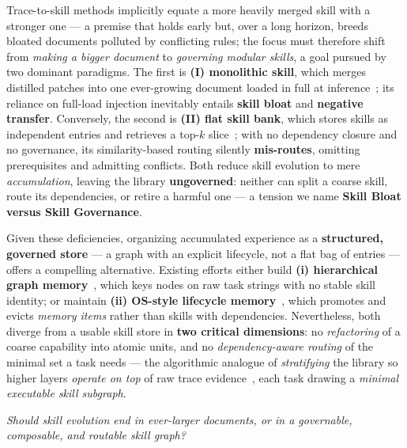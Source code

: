 Trace-to-skill methods implicitly equate a more heavily merged skill with a stronger one --- a premise that holds early but, over a long horizon, breeds bloated documents polluted by conflicting rules; the focus must therefore shift from \emph{making a bigger document} to \emph{governing modular skills}, a goal pursued by two dominant paradigms.
The first is \textbf{(I) monolithic skill}, which merges distilled patches into one ever-growing document loaded in full at inference~\citep{trace2skill,skillbrew,skillopt}; its reliance on full-load injection inevitably entails \textbf{skill bloat} and \textbf{negative transfer}.
Conversely, the second is \textbf{(II) flat skill bank}, which stores skills as independent entries and retrieves a top-$k$ slice~\citep{skillgraph_rl,gos}; with no dependency closure and no governance, its similarity-based routing silently \textbf{mis-routes}, omitting prerequisites and admitting conflicts.
Both reduce skill evolution to mere \emph{accumulation}, leaving the library \textbf{ungoverned}: neither can split a coarse skill, route its dependencies, or retire a harmful one --- a tension we name \textbf{Skill Bloat versus Skill Governance}.

Given these deficiencies, organizing accumulated experience as a \textbf{structured, governed store} --- a graph with an explicit lifecycle, not a flat bag of entries --- offers a compelling alternative.
Existing efforts either build \textbf{(i) hierarchical graph memory}~\citep{gmemory}, which keys nodes on raw task strings with no stable skill identity; or maintain \textbf{(ii) OS-style lifecycle memory}~\citep{memoryos,memos}, which promotes and evicts \emph{memory items} rather than skills with dependencies.
Nevertheless, both diverge from a usable skill store in \textbf{two critical dimensions}: no \emph{refactoring} of a coarse capability into atomic units, and no \emph{dependency-aware routing} of the minimal set a task needs --- the algorithmic analogue of \emph{stratifying} the library so higher layers \emph{operate on top} of raw trace evidence~\citep{boccaletti2014multilayer}, each task drawing a \textit{minimal executable skill subgraph}.
\begin{obsbox}
\textit{Should skill evolution end in ever-larger documents, or in a governable, composable, and routable skill graph?}
\end{obsbox}

